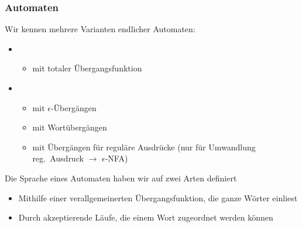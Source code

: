 \documentclass[aspectratio=1610,onlymath]{beamer}
\begin{document}
\begin{frame}\frametitle{Automaten}

Wir kennen mehrere \alert{Varianten endlicher Automaten}:
\begin{itemize}
\item {}
	\begin{itemize}
	\item mit totaler Übergangsfunktion
	\end{itemize}
\item {}
	\begin{itemize}
	\item mit $\epsilon$-Übergängen
	\item mit Wortübergängen
	\item mit Übergängen für reguläre Ausdrücke (nur für Umwandlung reg.\ Ausdruck $\to$ $\epsilon$-NFA)
	\end{itemize}
\end{itemize}\medskip

Die \alert{Sprache eines Automaten} haben wir auf zwei Arten definiert
\begin{itemize}
\item Mithilfe einer verallgemeinerten Übergangsfunktion, die ganze Wörter einliest
\item Durch akzeptierende Läufe, die einem Wort zugeordnet werden können
\end{itemize}

\end{frame}
\end{document}
